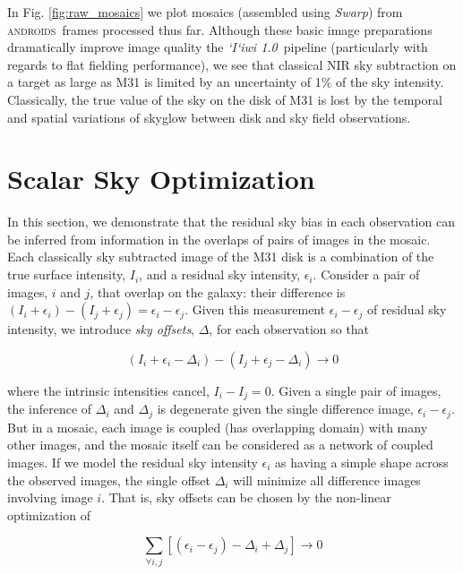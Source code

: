 \documentclass[iop]{emulateapj}
\newcommand{\sw}[1]{\textit{#1}} %
\newcommand{\iiwione}{\sw{`I`iwi 1.0}}
\newcommand{\androids}{\textsc{androids}}
\begin{document}
In Fig. \ref{fig:raw_mosaics} we plot mosaics (assembled using \sw{Swarp}) from \androids\ frames processed thus far. Although these basic image preparations dramatically improve image quality the \iiwione\ pipeline (particularly with regards to flat fielding performance), we see that classical NIR sky subtraction on a target as large as M31 is limited by an uncertainty of 1\% of the sky intensity. Classically, the true value of the sky on the disk of M31 is lost by the temporal and spatial variations of skyglow between disk and sky field observations.

\section{Scalar Sky Optimization}
\label{sec:scalar}

In this section, we demonstrate that the residual sky bias in each observation can be inferred from information in the overlaps of pairs of images in the mosaic. Each classically sky subtracted image of the M31 disk is a combination of the true surface intensity, $I_i$, and a residual sky intensity, $\epsilon_i$. Consider a pair of images, $i$ and $j$, that overlap on the galaxy: their difference is $(I_i+\epsilon_i) - (I_j+\epsilon_j) = \epsilon_i - \epsilon_j$. Given this measurement $\epsilon_i - \epsilon_j$ of residual sky intensity, we introduce \emph{sky offsets}, $\Delta$, for each observation so that

\begin{equation}
    (I_i + \epsilon_i - \Delta_i) - (I_j + \epsilon_j - \Delta_i) \rightarrow 0
\end{equation}

\noindent where the intrinsic intensities cancel, $I_i - I_j = 0$. Given a single pair of images, the inference of $\Delta_i$ and $\Delta_j$ is degenerate given the single difference image, $\epsilon_i-\epsilon_j$. But in a mosaic, each image is coupled (has overlapping domain) with many other images, and the mosaic itself can be considered as a network of coupled images. If we model the residual sky intensity $\epsilon_i$ as having a simple shape across the observed images, the single offset $\Delta_i$ will minimize all difference images involving image $i$. That is, sky offsets can be chosen by the non-linear optimization of

\begin{equation}
    \sum_{\forall i,j} [(\epsilon_i - \epsilon_j) - \Delta_i + \Delta_j] \rightarrow 0
    \label{eq:scalartheoryobj}
\end{equation}
\end{document}
